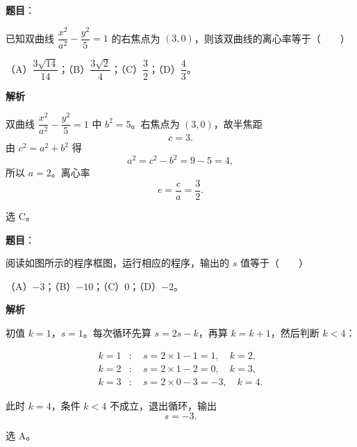 \begin{answer}

\textbf{题目}：

已知双曲线 $\dfrac{x^2}{a^2}-\dfrac{y^2}{5}=1$ 的右焦点为 $(3,0)$，则该双曲线的离心率等于\mbox{（　　）}

（A）$\dfrac{3\sqrt{14}}{14}$；（B）$\dfrac{3\sqrt2}{4}$；（C）$\dfrac32$；（D）$\dfrac43$。

\textbf{解析}

双曲线 $\dfrac{x^2}{a^2}-\dfrac{y^2}{5}=1$ 中 $b^2=5$。右焦点为 $(3,0)$，故半焦距
\nopagebreak[4]
\[c=3.\]
由 $c^2=a^2+b^2$ 得
\nopagebreak[4]
\[a^2=c^2-b^2=9-5=4,\]
所以 $a=2$。离心率
\nopagebreak[4]
\[e=\frac ca=\frac32.\]

选 C。


\end{answer}
\begin{answer}

\textbf{题目}：

阅读如图所示的程序框图，运行相应的程序，输出的 $s$ 值等于\mbox{（　　）}
\nopagebreak[4]
\begin{center}\end{center}
\nopagebreak[4]
（A）$-3$；（B）$-10$；（C）$0$；（D）$-2$。

\textbf{解析}

初值 $k=1$，$s=1$。每次循环先算 $s=2s-k$，再算 $k=k+1$，然后判断 $k<4$：

\nopagebreak[4]
\[\begin{aligned}
k=1&:\quad s=2\times1-1=1,\quad k=2,\\
k=2&:\quad s=2\times1-2=0,\quad k=3,\\
k=3&:\quad s=2\times0-3=-3,\quad k=4.
\end{aligned}\]

此时 $k=4$，条件 $k<4$ 不成立，退出循环，输出
\nopagebreak[4]
\[s=-3.\]

选 A。


\end{answer}
